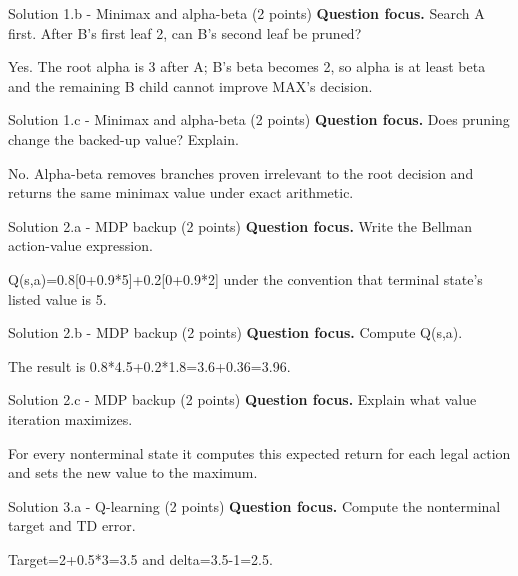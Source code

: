 \documentclass[aspectratio=169,11pt]{beamer}
\begin{document}
\begin{frame}{Solution 1.b - Minimax and alpha-beta (2 points)}
\small
\textbf{Question focus.} Search A first. After B's first leaf 2, can B's second leaf be pruned?

\vspace{0.25cm}
\answerlabel Yes. The root alpha is 3 after A; B's beta becomes 2, so alpha is at least beta and the remaining B child cannot improve MAX's decision.
\end{frame}

\begin{frame}{Solution 1.c - Minimax and alpha-beta (2 points)}
\small
\textbf{Question focus.} Does pruning change the backed-up value? Explain.

\vspace{0.25cm}
\answerlabel No. Alpha-beta removes branches proven irrelevant to the root decision and returns the same minimax value under exact arithmetic.
\end{frame}

\begin{frame}{Solution 2.a - MDP backup (2 points)}
\small
\textbf{Question focus.} Write the Bellman action-value expression.

\vspace{0.25cm}
\answerlabel Q(s,a)=0.8[0+0.9*5]+0.2[0+0.9*2] under the convention that terminal state's listed value is 5.
\end{frame}

\begin{frame}{Solution 2.b - MDP backup (2 points)}
\small
\textbf{Question focus.} Compute Q(s,a).

\vspace{0.25cm}
\answerlabel The result is 0.8*4.5+0.2*1.8=3.6+0.36=3.96.
\end{frame}

\begin{frame}{Solution 2.c - MDP backup (2 points)}
\small
\textbf{Question focus.} Explain what value iteration maximizes.

\vspace{0.25cm}
\answerlabel For every nonterminal state it computes this expected return for each legal action and sets the new value to the maximum.
\end{frame}

\begin{frame}{Solution 3.a - Q-learning (2 points)}
\small
\textbf{Question focus.} Compute the nonterminal target and TD error.

\vspace{0.25cm}
\answerlabel Target=2+0.5*3=3.5 and delta=3.5-1=2.5.
\end{frame}
\end{document}
